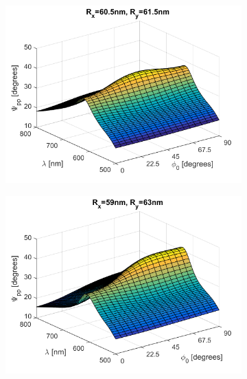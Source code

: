 \begin{figure}[h!]
    \begin{subfigure}{0.5\textwidth}
        \centering
        \includegraphics[width=\linewidth]{figures/ch4/S5A/comparisons/Psipp_vs_lambda_vs_phi_Rx605_Ry615_Rz348_t369_axy209_theta55.png}
    \end{subfigure}
    \begin{subfigure}{0.5\textwidth}
        \centering
        \includegraphics[width=\linewidth]{figures/ch4/S5A/comparisons/Psipp_vs_lambda_vs_phi_Rx59_Ry63_Rz348_t369_axy209_theta55.png}
    \end{subfigure}
    

\end{figure}
